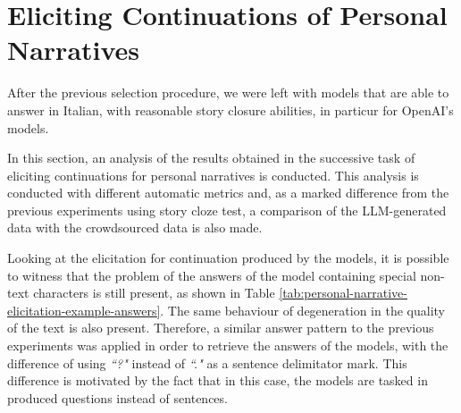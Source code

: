 \section{Eliciting Continuations of Personal Narratives}
\label{cha:methodology-personal-narrative-elicitation-results}
After the previous selection procedure, we were left with models that are able to answer in Italian, with reasonable story closure abilities, in particur for OpenAI's models.

In this section, an analysis of the results obtained in the successive task of eliciting continuations for personal narratives is conducted. This analysis is conducted with different automatic metrics and, as a marked difference from the previous experiments using story cloze test, a comparison of the LLM-generated data with the crowdsourced data is also made.


Looking at the elicitation for continuation produced by the models, it is possible to witness that the problem of the answers of the model containing special non-text characters is still present, as shown in Table \ref{tab:personal-narrative-elicitation-example-answers}. The same behaviour of degeneration in the quality of the text is also present. Therefore, a similar answer pattern to the previous experiments was applied in order to retrieve the answers of the models, with the difference of using \emph{``?"} instead of \emph{``."} as a sentence delimitator mark. This difference is motivated by the fact that in this case, the models are tasked in produced questions instead of sentences.
% 


